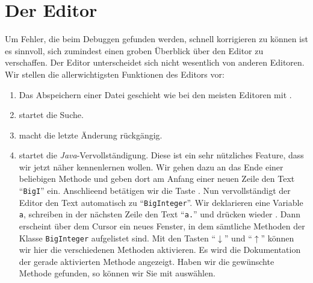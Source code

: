\documentclass{article}
\begin{document}
\section{Der Editor}
Um Fehler, die beim Debuggen gefunden werden, schnell korrigieren zu k\"onnen ist es
sinnvoll, sich zumindest einen groben Überblick \"uber den Editor zu verschaffen.
 Der Editor unterscheidet sich nicht wesentlich von anderen Editoren.
Wir stellen die allerwichtigsten Funktionen des Editors vor:
\begin{enumerate}
\item Das Abspeichern einer Datei geschieht wie bei den meisten Editoren mit .
\item {} startet die Suche.
\item {} macht die letzte Änderung r\"uckg\"angig.
\item {} startet die \textsl{Java}-Vervollst\"andigung.
      Diese ist ein sehr n\"utzliches Feature, dass wir jetzt n\"aher kennenlernen wollen.
      Wir gehen dazu an das Ende einer beliebigen Methode  und geben dort am Anfang einer
      neuen Zeile den Text ``\texttt{BigI}'' ein. Anschlie\3end bet\"atigen wir
      die Taste .  Nun vervollst\"andigt der Editor 
      den Text automatisch zu ``\texttt{BigInteger}''.  Wir deklarieren eine Variable
      \texttt{a}, schreiben in der  n\"achsten Zeile den Text ``\texttt{a.}'' und dr\"ucken
      wieder . Dann erscheint \"uber dem Cursor ein neues
      Fenster, in dem s\"amtliche Methoden der Klasse \texttt{BigInteger} aufgelistet sind.
      Mit den Tasten ``$\downarrow$'' und ``$\uparrow$'' k\"onnen wir hier die verschiedenen Methoden
      aktivieren.  Es wird die Dokumentation der gerade aktivierten Methode angezeigt.  Haben wir
      die gew\"unschte Methode gefunden, so k\"onnen wir Sie mit 
      ausw\"ahlen.


\end{enumerate}
\end{document}
